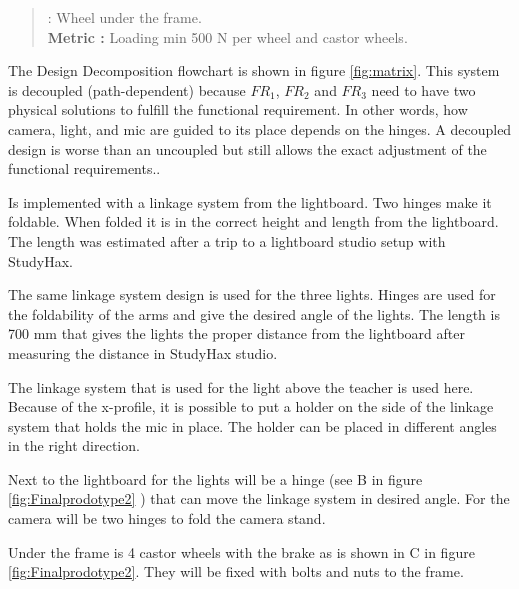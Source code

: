 \documentclass[a4paper]{jpconf}
\begin{document}
\begin{quote} 
	\textbf{} : Wheel under the frame.
	\\ \textbf{Metric :} Loading min 500 N per wheel and castor wheels.
\end{quote}

The Design Decomposition flowchart is shown in figure \ref{fig:matrix}.
This system is decoupled (path-dependent) because $FR_1$, $FR_2$ and $FR_3$ need to have two physical solutions to fulfill the functional requirement.
In other words, how camera, light, and mic are guided to its place depends on the hinges.
A decoupled design is worse than an uncoupled but still allows the exact adjustment of the functional requirements.\cite{system_design}.


\textbf{} Is implemented with a linkage system from the lightboard.
Two hinges make it foldable.
When folded it is in the correct height and length from the lightboard.
The length was estimated after a trip to a lightboard studio setup with StudyHax.

\textbf{} The same linkage system design is used for the three lights.
Hinges are used for the foldability of the arms and give the desired angle of the lights.
The length is 700 mm that gives the lights the proper distance from the lightboard after measuring the distance in StudyHax studio.

\textbf{} The linkage system that is used for the light above the teacher is used here.
Because of the x-profile, it is possible to put a holder on the side of the linkage system that holds the mic in place.
The holder can be placed in different angles in the right direction.

\textbf{} Next to the lightboard for the lights will be a hinge (see B in figure \ref{fig:Finalprodotype2} ) that can move the linkage system in desired angle.
For the camera will be two hinges to fold the camera stand.

\textbf{} Under the frame is 4 castor wheels with the brake as is shown in C in figure \ref{fig:Finalprodotype2}.
They will be fixed with bolts and nuts to the frame.
\end{document}
